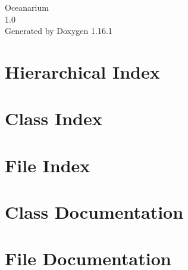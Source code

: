 \documentclass[twoside]{book}
\newcommand{\+}{\discretionary{\mbox{\scriptsize$\hookleftarrow$}}{}{}}
\newcommand{\clearemptydoublepage}{%
    \newpage{\pagestyle{empty}\cleardoublepage}%
  }
\begin{document}
  \raggedbottom
    \hypersetup{pageanchor=false,
                bookmarksnumbered=true,
                pdfencoding=unicode
               }
  \begin{titlepage}
  \vspace*{7cm}
  \begin{center}%
  {\Large Oceanarium}\\
  [1ex]\large 1.\+0 \\
  \vspace*{1cm}
  {\large Generated by Doxygen 1.16.1}\\
  \end{center}
  \end{titlepage}
  \clearemptydoublepage
  \tableofcontents
  \clearemptydoublepage
  \hypersetup{pageanchor=true}
\chapter{Hierarchical Index}

\chapter{Class Index}

\chapter{File Index}

\chapter{Class Documentation}











\chapter{File Documentation}











  \backmatter
  \newpage
  \clearemptydoublepage
  \printindex
\end{document}
